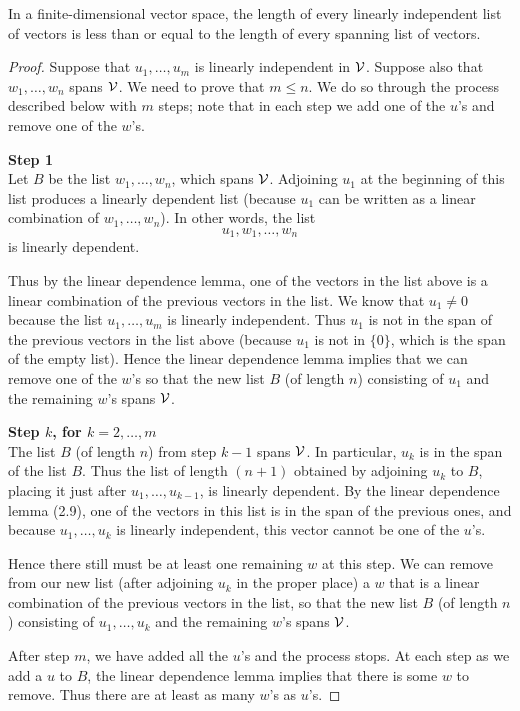 \begin{theorem}
	In a finite-dimensional vector space, the length of every linearly independent list of vectors is less than or equal to the length of every spanning list of vectors.
\end{theorem}
\begin{proof}
	Suppose that $u_1, \dots, u_m$ is linearly independent in $\mathcal{V}$. Suppose also that $w_1, \dots, w_n$ spans $\mathcal{V}$. We need to prove that $m \le n$. We do so through the process described below with $m$ steps; note that in each step we add one of the $u$'s and remove one of the $w$'s.
	
	\noindent \textbf{Step 1} \\
	Let $B$ be the list $w_1, \dots, w_n$, which spans $\mathcal{V}$. Adjoining $u_1$ at the beginning of this list produces a linearly dependent list (because $u_1$ can be written as a linear combination of $w_1, \dots, w_n$). In other words, the list
	\[
	u_1, w_1, \dots, w_n
	\]
	is linearly dependent.
	
	Thus by the linear dependence lemma, one of the vectors in the list above is a linear combination of the previous vectors in the list. We know that $u_1 \neq 0$ because the list $u_1, \dots, u_m$ is linearly independent. Thus $u_1$ is not in the span of the previous vectors in the list above (because $u_1$ is not in $\{0\}$, which is the span of the empty list). Hence the linear dependence lemma implies that we can remove one of the $w$'s so that the new list $B$ (of length $n$) consisting of $u_1$ and the remaining $w$'s spans $\mathcal{V}$.
	
	\noindent \textbf{Step $k$, for $k = 2, \dots, m$} \\
	The list $B$ (of length $n$) from step $k - 1$ spans $\mathcal{V}$. In particular, $u_k$ is in the span of the list $B$. Thus the list of length $(n + 1)$ obtained by adjoining $u_k$ to $B$, placing it just after $u_1, \dots, u_{k-1}$, is linearly dependent. By the linear dependence lemma (2.9), one of the vectors in this list is in the span of the previous ones, and because $u_1, \dots, u_k$ is linearly independent, this vector cannot be one of the $u$'s.
	
	Hence there still must be at least one remaining $w$ at this step. We can remove from our new list (after adjoining $u_k$ in the proper place) a $w$ that is a linear combination of the previous vectors in the list, so that the new list $B$ (of length $n$) consisting of $u_1, \dots, u_k$ and the remaining $w$'s spans $\mathcal{V}$.
	
	After step $m$, we have added all the $u$'s and the process stops. At each step as we add a $u$ to $B$, the linear dependence lemma implies that there is some $w$ to remove. Thus there are at least as many $w$'s as $u$'s.
\end{proof}
